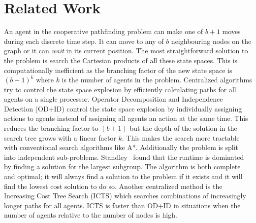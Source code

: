 \section{Related Work}\label{sec:related}
An agent in the cooperative pathfinding problem can make one of $b+1$ moves 
during each discrete time step. It can move to any of $b$ neighbouring nodes on 
the graph or it can \emph{wait} in its current position. The most 
straightforward 
solution to the problem is search the Cartesian products of all these state 
spaces. This is computationally inefficient \cite{hopcroft1984,sharon2013} as 
the branching factor of the new state space is $(b+1)^k$ where $k$ is the 
number of agents in the problem. Centralized algorithms try to control the 
state space explosion by efficiently calculating paths for all agents on a 
single processor. Operator Decomposition and Independence Detection (OD+ID) 
\cite{standley2010,standley2011} control the state space explosion by 
individually assigning actions to agents instead of assigning all agents an 
action at the same time. This reduces the branching factor to $(b+1)$ but 
the depth of the solution in the search tree grows with a linear factor $k$. 
This makes the search more tractable with conventional search algorithms like 
A*. Additionally the problem is split into independent sub-problems.
Standley~ found that the runtime is dominated by 
finding a solution 
for the largest subgroup. The algorithm is both complete and optimal; it will 
always find a solution to the problem if it exists and it will find the lowest 
cost solution to do so. Another centralized method is the Increasing Cost Tree 
Search (ICTS) \cite{sharon2013} which searches combinations of increasingly 
longer paths for all agents. ICTS is faster than OD+ID in situations when the 
number of agents relative to the number of nodes is high.

